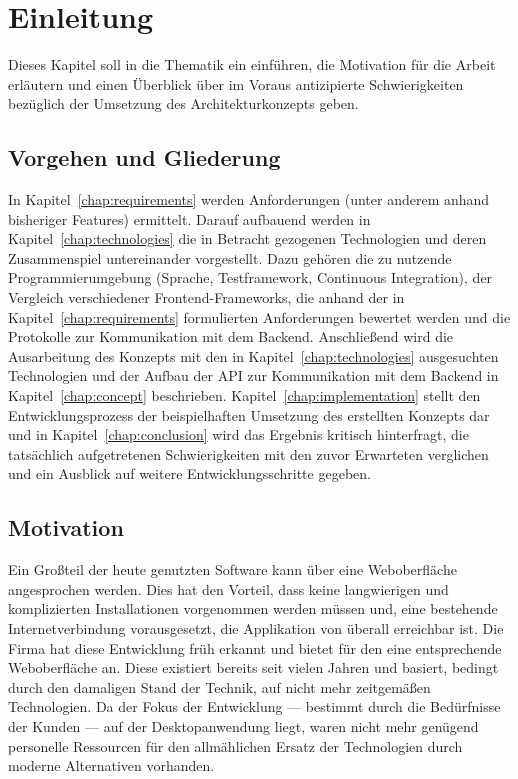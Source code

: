 \chapter{Einleitung}\label{chap:introduction}
Dieses Kapitel soll in die Thematik ein einführen, die Motivation für die Arbeit erläutern und einen Überblick über im Voraus antizipierte Schwierigkeiten bezüglich der Umsetzung des Architekturkonzepts geben.

\section{Vorgehen und Gliederung}
In Kapitel~\ref{chap:requirements} werden Anforderungen (unter anderem anhand bisheriger Features) ermittelt.
Darauf aufbauend werden in Kapitel~\ref{chap:technologies} die in Betracht gezogenen Technologien und deren Zusammenspiel untereinander vorgestellt. Dazu gehören die zu nutzende Programmierumgebung (Sprache, Testframework, Continuous Integration), der Vergleich verschiedener Frontend-Frameworks, die anhand der in Kapitel~\ref{chap:requirements} formulierten Anforderungen bewertet werden und die Protokolle zur Kommunikation mit dem Backend.
Anschließend wird die Ausarbeitung des Konzepts mit den in Kapitel~\ref{chap:technologies} ausgesuchten Technologien und der Aufbau der API zur Kommunikation mit dem Backend in Kapitel~\ref{chap:concept} beschrieben.
Kapitel~\ref{chap:implementation} stellt den Entwicklungsprozess der beispielhaften Umsetzung des erstellten Konzepts dar und in Kapitel~\ref{chap:conclusion} wird das Ergebnis kritisch hinterfragt, die tatsächlich aufgetretenen Schwierigkeiten mit den zuvor Erwarteten verglichen und ein Ausblick auf weitere Entwicklungsschritte gegeben.

\section{Motivation}
Ein Großteil der heute genutzten Software kann über eine Weboberfläche angesprochen werden. Dies hat den Vorteil, dass keine langwierigen und komplizierten Installationen vorgenommen werden müssen und, eine bestehende Internetverbindung vorausgesetzt, die Applikation von überall erreichbar ist. Die Firma  hat diese Entwicklung früh erkannt und bietet für den  eine entsprechende Weboberfläche an. Diese existiert bereits seit vielen Jahren und basiert, bedingt durch den damaligen Stand der Technik, auf nicht mehr zeitgemäßen Technologien. Da der Fokus der Entwicklung --- bestimmt durch die Bedürfnisse der Kunden --- auf der Desktopanwendung liegt, waren nicht mehr genügend personelle Ressourcen für den allmählichen Ersatz der Technologien durch moderne Alternativen vorhanden.

